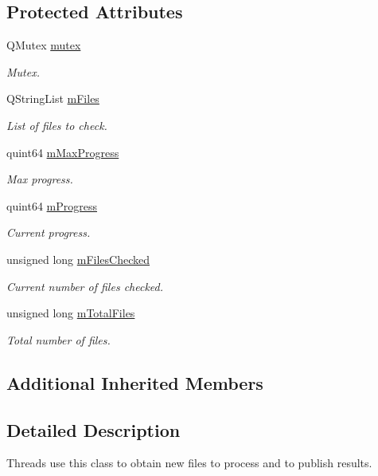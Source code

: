 \subsection*{Protected Attributes}
\begin{DoxyCompactItemize}
\item 
Q\-Mutex \hyperlink{class_thread_result_a32543bd6b9a72184fc9ba7cec8a79eb1}{mutex}
\begin{DoxyCompactList}\small\item\em Mutex. \end{DoxyCompactList}\item 
Q\-String\-List \hyperlink{class_thread_result_a0f4173fd7c5a939f2f675af4fcf25f73}{m\-Files}
\begin{DoxyCompactList}\small\item\em List of files to check. \end{DoxyCompactList}\item 
quint64 \hyperlink{class_thread_result_a060f28123eea6a0c777ab488aa378ed6}{m\-Max\-Progress}
\begin{DoxyCompactList}\small\item\em Max progress. \end{DoxyCompactList}\item 
quint64 \hyperlink{class_thread_result_a51c4763ca09dbec15f74b2fbccecc467}{m\-Progress}
\begin{DoxyCompactList}\small\item\em Current progress. \end{DoxyCompactList}\item 
unsigned long \hyperlink{class_thread_result_acc0b57f2dd6c0d3ff84e88e86e5e5464}{m\-Files\-Checked}
\begin{DoxyCompactList}\small\item\em Current number of files checked. \end{DoxyCompactList}\item 
unsigned long \hyperlink{class_thread_result_a387d860d3a9d220642efd8d8240e6d5c}{m\-Total\-Files}
\begin{DoxyCompactList}\small\item\em Total number of files. \end{DoxyCompactList}\end{DoxyCompactItemize}
\subsection*{Additional Inherited Members}


\subsection{Detailed Description}
Threads use this class to obtain new files to process and to publish results. 

